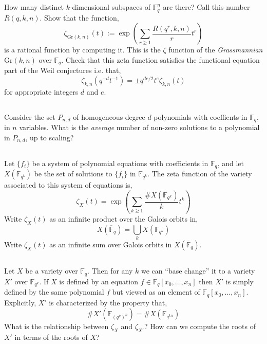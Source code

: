 \documentclass[12pt]{article}
\newcommand{\FF}{\mathbb{F}}
\theoremstyle{remark}
\theoremstyle{definition}
\begin{document}
\subsection{}

\newcommand{\Gr}{\mathrm{Gr}}

How many distinct $k$-dimensional subspaces of $\FF^n_q$ are there? Call this number $R(q, k, n)$. Show that the function,
\[ \zeta_{\Gr(k,n)}(t) := \exp{\left( \sum_{r \ge 1} \frac{R(q^r, k, n)}{r} t^r \right) }\]
is a rational function by computing it. This is the $\zeta$ function of the \textit{Grassmannian} $\Gr(k, n)$ over $\FF_q$. Check that this zeta function satisfies the functional equation part of the Weil conjectures i.e. that,
\[ \zeta_{k,n}(q^{-d} t^{-1}) = \pm q^{de/2} t^e \zeta_{k,n}(t) \]
for appropriate integers $d$ and $e$.

\subsection{}

Consider the set $P_{n,d}$ of homogeneous degree $d$ polynomials with coeffients in $\FF_q$, in $n$ variables. What is the \textit{average} number of non-zero solutions to a polynomial in $P_{n,d}$, up to scaling?

\subsection{}

Let $\{ f_i \}$ be a system of polynomial equations with coefficients in $\FF_q$, and let $X(\FF_{q^k})$ be the set of solutions to $\{ f_i \}$ in $\FF_{q^k}$. The zeta function of the variety associated to this system of equations is,
\[ \zeta_X(t) = \exp{\left( \sum_{k \ge 1} \frac{\# X(\FF_{q^k})}{k} t^k \right)}\]
Write $\zeta_X(t)$ as an infinite product over the Galois orbits in,
\[ X(\overline{\FF}_q) = \bigcup_k X(\FF_{q^k}) \]
Write $\zeta_X(t)$ as an infinite sum over Galois orbits in $X(\overline{\FF}_q)$.

\subsection{} \label{base_change}

Let $X$ be a variety over $\FF_q$. Then for any $k$ we can ``base change'' it to a variety $X'$ over $\FF_{q^k}$. If $X$ is defined by an equation $f \in \FF_q[x_0, \dots, x_n]$ then $X'$ is simply defined by the same polynomial $f$ but viewed as an element of $\FF_q[x_0, \dots, x_n]$. Explicitly, $X'$ is characterized by the property that,
\[ \# X'(\FF_{(q^k)^n}) = \# X(\FF_{q^{kn}}) \]
What is the relationship between $\zeta_X$ and $\zeta_{X'}$? How can we compute the roots of $X'$ in terms of the roots of $X$?
\end{document}
